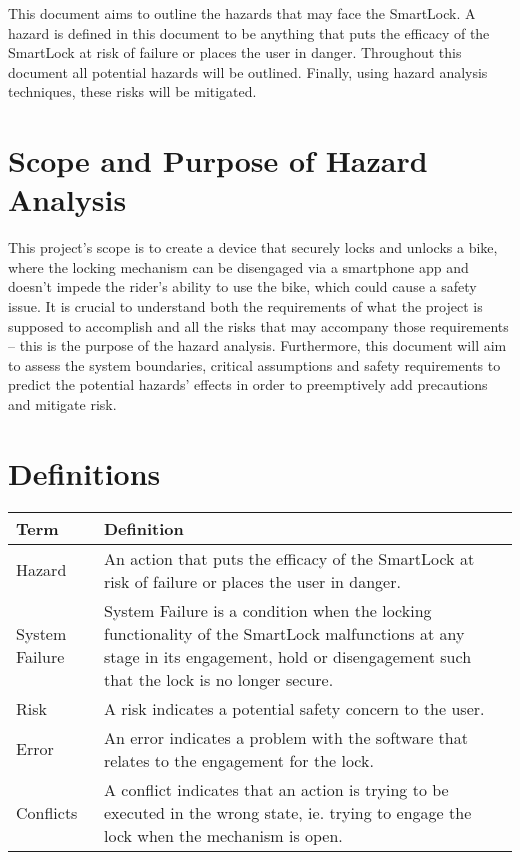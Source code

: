 \documentclass{article}
\begin{document}
This document aims to outline the hazards that may face the SmartLock.  A hazard is defined in this document to be anything that puts the efficacy of the SmartLock at risk of failure or places the user in danger.  Throughout this document all potential hazards will be outlined. Finally, using hazard analysis techniques,  these risks will be mitigated. 

\section{Scope and Purpose of Hazard Analysis}

This project's scope is to create a device that securely locks and unlocks a bike, where the locking mechanism can be disengaged via a smartphone app and doesn’t impede the rider's ability to use the bike, which could cause a safety issue.  It is crucial to understand both the requirements of what the project is supposed to accomplish and all the risks that may accompany those requirements – this is the purpose of the hazard analysis.  Furthermore, this document will aim to assess the system boundaries, critical assumptions and safety requirements to predict the potential hazards' effects in order to preemptively add precautions and mitigate risk. 


\section{Definitions}

\begin{minipage}{\textwidth}
\renewcommand*{\arraystretch}{1.5}
\begin{tabular}{| p{} | p{} |}
 \hline
 Term & Definition \\ 
 \hline
 Hazard & An action that puts the efficacy of the SmartLock at risk of failure or places the user in danger.\\ 
  \hline
 System Failure & System Failure is a condition when the locking functionality of the SmartLock malfunctions at any stage in its engagement, hold or disengagement such that the lock is no longer secure.\\ 
  \hline
 Risk & A risk indicates a potential safety concern to the user.\\ 
  \hline
 Error & An error indicates a problem with the software that relates to the engagement for the lock.\\ 
  \hline
 Conflicts & A conflict indicates that an action is trying to be executed in the wrong state, ie. trying to engage the lock when the mechanism is open.\\ 
 \hline
\end{tabular}
\end{minipage}\\
\end{document}
